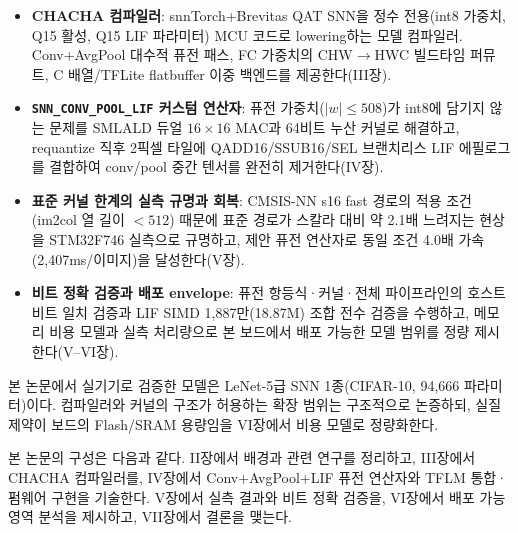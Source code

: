 \begin{itemize}
\item \textbf{CHACHA 컴파일러}: snnTorch+Brevitas QAT SNN을 정수 전용(int8 가중치, Q15 활성, Q15 LIF 파라미터) MCU 코드로 lowering하는 모델 컴파일러. Conv+AvgPool 대수적 퓨전 패스, FC 가중치의 CHW$\rightarrow$HWC 빌드타임 퍼뮤트, C 배열/TFLite flatbuffer 이중 백엔드를 제공한다(III장).
\item \textbf{\texttt{SNN\_CONV\_POOL\_LIF} 커스텀 연산자}: 퓨전 가중치($|w|\le508$)가 int8에 담기지 않는 문제를 SMLALD 듀얼 $16\times16$ MAC과 64비트 누산 커널로 해결하고, requantize 직후 2픽셀 타일에 QADD16/SSUB16/SEL 브랜치리스 LIF 에필로그를 결합하여 conv/pool 중간 텐서를 완전히 제거한다(IV장).
\item \textbf{표준 커널 한계의 실측 규명과 회복}: CMSIS-NN s16 fast 경로의 적용 조건(im2col 열 길이 $<512$) 때문에 표준 경로가 스칼라 대비 약 2.1배 느려지는 현상을 STM32F746 실측으로 규명하고, 제안 퓨전 연산자로 동일 조건 4.0배 가속(2,407ms/이미지)을 달성한다(V장).
\item \textbf{비트 정확 검증과 배포 envelope}: 퓨전 항등식·커널·전체 파이프라인의 호스트 비트 일치 검증과 LIF SIMD 1,887만(18.87M) 조합 전수 검증을 수행하고, 메모리 비용 모델과 실측 처리량으로 본 보드에서 배포 가능한 모델 범위를 정량 제시한다(V--VI장).
\end{itemize}

본 논문에서 실기기로 검증한 모델은 LeNet-5급\cite{lecun1998gradient} SNN 1종(CIFAR-10\cite{krizhevsky2009cifar}, 94,666 파라미터)이다. 컴파일러와 커널의 구조가 허용하는 확장 범위는 구조적으로 논증하되, 실질 제약이 보드의 Flash/SRAM 용량임을 VI장에서 비용 모델로 정량화한다.

본 논문의 구성은 다음과 같다. II장에서 배경과 관련 연구를 정리하고, III장에서 CHACHA 컴파일러를, IV장에서 Conv+AvgPool+LIF 퓨전 연산자와 TFLM 통합·펌웨어 구현을 기술한다. V장에서 실측 결과와 비트 정확 검증을, VI장에서 배포 가능 영역 분석을 제시하고, VII장에서 결론을 맺는다.
